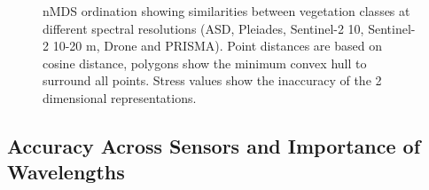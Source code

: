 \documentclass[
  letterpaper,
  11pt,
  english,
  singlespacing,
  headsepline]{MastersDoctoralThesis}
\begin{document}
\begin{spacing}{1.5}
\begin{figure}
{}

\caption{\label{fig-MDSFIG}nMDS ordination showing similarities between
vegetation classes at different spectral resolutions (ASD, Pleiades,
Sentinel-2 10, Sentinel-2 10-20 m, Drone and PRISMA). Point distances
are based on cosine distance, polygons show the minimum convex hull to
surround all points. Stress values show the inaccuracy of the 2
dimensional representations.}

\end{figure}%

\subsection{Accuracy Across Sensors and Importance of
Wavelengths}\label{accuracy-across-sensors-and-importance-of-wavelengths}


\end{spacing}
\end{document}

